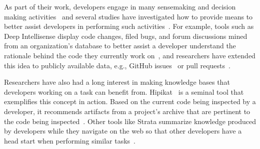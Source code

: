 




As part of their work, developers engage in many sensemaking and decision making activities~\cite{sillito2006} and several studies have investigated how to 
provide means to better  
assist developers in performing such activities~\cite{Liu2018Unakite, liu2021, barnett2015}.
For example, tools such as Deep Intellisense 
display code changes, filed bugs, and forum discussions 
mined from an organization's database to better assist a developer
understand 
the rationale behind the code they currently work on~\cite{Holmes2008},
and researchers have extended this idea to  
publicly available data, e.g., GitHub issues~\cite{Viviani2019}
or pull requests~\cite{freire2021}. 



Researchers have also had a long interest in 
making knowledge bases
that developers working on a task can benefit from. 
Hipikat~\cite{Cubranic2005} is a seminal tool that exemplifies this concept in action.
Based on the current code being inspected by a developer, 
it recommends artifacts from a project's archive 
that are pertinent to the code being inspected~\cite{Cubranic2005}.
Other tools like Strata summarize knowledge produced by developers 
while they navigate on the web so that other developers have a 
 head start when performing similar tasks~\cite{liu2021}.